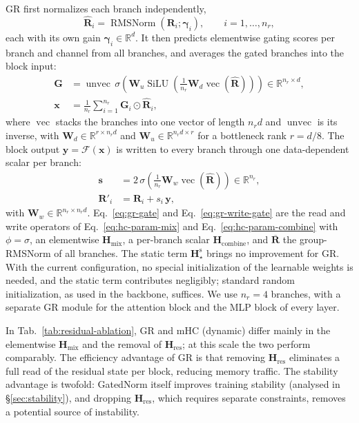 GR first normalizes each branch independently,
\begin{equation}
\widehat{\bm{R}}_i = \operatorname{RMSNorm}\left(\bm{R}_i;\bm{\gamma}_i\right),
\qquad i=1,\dots,n_r,
\label{eq:gr-norm}
\end{equation}
each with its own gain $\bm{\gamma}_i\in\mathbb{R}^{d}$. It then predicts 
elementwise gating scores per branch and channel from all branches, and averages the gated
branches into the block input:
\begin{align}
\bm{G} &= \operatorname{unvec}\,\sigma\left(\bm{W}_{u}
\operatorname{SiLU}\left(
   \tfrac{1}{n_r}\bm{W}_{d}\operatorname{vec}(\widehat{\bm{R}})\right)\right)
   \in\mathbb{R}^{n_r\times d},
   \label{eq:gr-gate}\\
\bm{x} &= \frac{1}{n_r}\sum_{i=1}^{n_r}\bm{G}_i\odot\widehat{\bm{R}}_i ,
   \label{eq:gr-read}
\end{align}
where $\operatorname{vec}$ stacks the branches into one vector of length
$n_r d$ and $\operatorname{unvec}$ is its inverse, with
$\bm{W}_{d}\in\mathbb{R}^{r\times n_r d}$ and
$\bm{W}_{u}\in\mathbb{R}^{n_r d\times r}$ for a bottleneck rank $r = d / 8$.
The block output $\bm{y}=\mathcal{F}(\bm{x})$ is written to every branch
through one data-dependent scalar per branch:
\begin{align}
\bm{s} &= 2\,\sigma\left(\tfrac{1}{n_r}\bm{W}_{w}
\operatorname{vec}(\widehat{\bm{R}})\right)
   \in\mathbb{R}^{n_r},
   \label{eq:gr-write-gate}\\
\bm{R}'_i &= \bm{R}_i + s_i\,\bm{y} ,
   \label{eq:gr-write}
\end{align}
with $\bm{W}_{w}\in\mathbb{R}^{n_r\times n_r d}$.
Eq.~\eqref{eq:gr-gate} and Eq.~\eqref{eq:gr-write-gate} are the read and
write operators of Eq.~\eqref{eq:hc-param-mix} and
Eq.~\eqref{eq:hc-param-combine} with $\phi=\sigma$, an elementwise
$\bm{H}_{\mathrm{mix}}$, a per-branch scalar $\bm{H}_{\mathrm{combine}}$,
and $\overline{\bm{R}}$ the group-RMSNorm of all branches.
The static term $\bm{H}^{\mathrm{s}}_{\star}$ brings no improvement for GR.
With the current configuration, no special initialization of the learnable
weights is needed, and the static term contributes negligibly; standard
random initialization, as used in the backbone, suffices.
We use $n_r=4$ branches, with a separate GR module for the attention block
and the MLP block of every layer.

In Tab.~\ref{tab:residual-ablation}, GR and mHC (dynamic) differ mainly in
the elementwise $\bm{H}_{\mathrm{mix}}$ and the removal of
$\bm{H}_{\mathrm{res}}$; at this scale the two perform comparably. The
efficiency advantage of GR is that removing $\bm{H}_{\mathrm{res}}$
eliminates a full read of the residual state per block, reducing memory
traffic. 
The stability advantage is twofold: GatedNorm itself improves
training stability (analysed in \S\ref{sec:stability}), and dropping $\bm{H}_{\mathrm{res}}$, which requires separate constraints, removes a potential source of instability.


